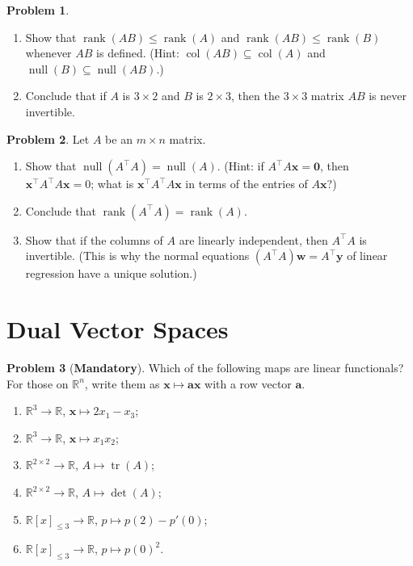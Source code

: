 \documentclass[11pt]{article}
\theoremstyle{definition}
\newtheorem{problem}{Problem}[section]
\newcommand{\mandatory}{\textcolor{red!70!black}{\textbf{Mandatory}}}
\DeclareMathOperator{\rank}{rank}
\DeclareMathOperator{\Null}{null}
\DeclareMathOperator{\col}{col}
\DeclareMathOperator{\tr}{tr}
\begin{document}
\begin{problem}\label{pr:rankAB}
    \begin{enumerate}[label=(\alph*)]
        \item Show that $\rank(AB) \leq \rank(A)$ and $\rank(AB) \leq \rank(B)$ whenever $AB$ is defined. (Hint: $\col(AB) \subseteq \col(A)$ and $\Null(B) \subseteq \Null(AB)$.)
        \item Conclude that if $A$ is $3 \times 2$ and $B$ is $2 \times 3$, then the $3 \times 3$ matrix $AB$ is never invertible.
    \end{enumerate}
\end{problem}

\begin{problem}\label{pr:ATA}
    Let $A$ be an $m \times n$ matrix.
    \begin{enumerate}[label=(\alph*)]
        \item Show that $\Null(A^\top A) = \Null(A)$. (Hint: if $A^\top A \mathbf{x} = \mathbf{0}$, then $\mathbf{x}^\top A^\top A \mathbf{x} = 0$; what is $\mathbf{x}^\top A^\top A \mathbf{x}$ in terms of the entries of $A\mathbf{x}$?)
        \item Conclude that $\rank(A^\top A) = \rank(A)$.
        \item Show that if the columns of $A$ are linearly independent, then $A^\top A$ is invertible. (This is why the normal equations $(A^\top A)\mathbf{w} = A^\top \mathbf{y}$ of linear regression have a unique solution.)
    \end{enumerate}
\end{problem}

\section{Dual Vector Spaces}

\begin{problem}[\mandatory]\label{pr:functionals}
    Which of the following maps are linear functionals? For those on $\mathbb{R}^n$, write them as $\mathbf{x} \mapsto \mathbf{a}\mathbf{x}$ with a row vector $\mathbf{a}$.
    \begin{enumerate}[label=(\alph*)]
        \item $\mathbb{R}^3 \to \mathbb{R}$, $\mathbf{x} \mapsto 2x_1 - x_3$;
        \item $\mathbb{R}^3 \to \mathbb{R}$, $\mathbf{x} \mapsto x_1 x_2$;
        \item $\mathbb{R}^{2 \times 2} \to \mathbb{R}$, $A \mapsto \tr(A)$;
        \item $\mathbb{R}^{2 \times 2} \to \mathbb{R}$, $A \mapsto \det(A)$;
        \item $\mathbb{R}[x]_{\leq 3} \to \mathbb{R}$, $p \mapsto p(2) - p'(0)$;
        \item $\mathbb{R}[x]_{\leq 3} \to \mathbb{R}$, $p \mapsto p(0)^2$.
    \end{enumerate}
\end{problem}
\end{document}
